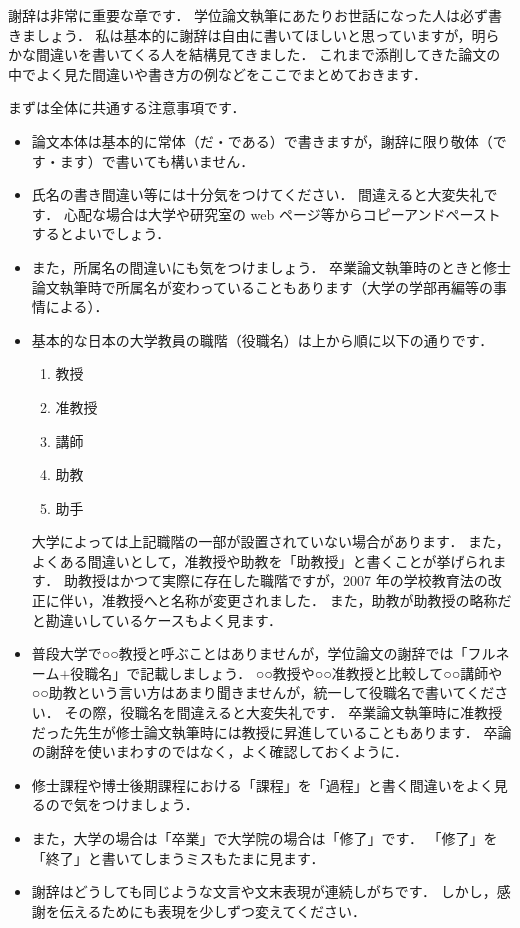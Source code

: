 \acknowledge

謝辞は非常に重要な章です．
学位論文執筆にあたりお世話になった人は必ず書きましょう．
私は基本的に謝辞は自由に書いてほしいと思っていますが，明らかな間違いを書いてくる人を結構見てきました．
これまで添削してきた論文の中でよく見た間違いや書き方の例などをここでまとめておきます．

まずは全体に共通する注意事項です．
\begin{itemize}
    \item 論文本体は基本的に常体（だ・である）で書きますが，謝辞に限り敬体（です・ます）で書いても構いません．
    \item 氏名の書き間違い等には十分気をつけてください．
    間違えると大変失礼です．
    心配な場合は大学や研究室の web ページ等からコピーアンドペーストするとよいでしょう．
    \item また，所属名の間違いにも気をつけましょう．
    卒業論文執筆時のときと修士論文執筆時で所属名が変わっていることもあります（大学の学部再編等の事情による）．
    \item 基本的な日本の大学教員の職階（役職名）は上から順に以下の通りです．
    \begin{enumerate}
        \item 教授
        \item 准教授
        \item 講師
        \item 助教
        \item 助手
    \end{enumerate}
    大学によっては上記職階の一部が設置されていない場合があります．
    また，よくある間違いとして，准教授や助教を「助教授」と書くことが挙げられます．
    助教授はかつて実際に存在した職階ですが，2007 年の学校教育法の改正に伴い，准教授へと名称が変更されました．
    また，助教が助教授の略称だと勘違いしているケースもよく見ます．
    \item 普段大学で○○教授と呼ぶことはありませんが，学位論文の謝辞では「フルネーム$+$役職名」で記載しましょう．
    ○○教授や○○准教授と比較して○○講師や○○助教という言い方はあまり聞きませんが，統一して役職名で書いてください．
    その際，役職名を間違えると大変失礼です．
    卒業論文執筆時に准教授だった先生が修士論文執筆時には教授に昇進していることもあります．
    卒論の謝辞を使いまわすのではなく，よく確認しておくように．
    \item 修士課程や博士後期課程における「課程」を「過程」と書く間違いをよく見るので気をつけましょう．
    \item また，大学の場合は「卒業」で大学院の場合は「修了」です．
    「修了」を「終了」と書いてしまうミスもたまに見ます．
    \item 謝辞はどうしても同じような文言や文末表現が連続しがちです．
    しかし，感謝を伝えるためにも表現を少しずつ変えてください．
\end{itemize}

